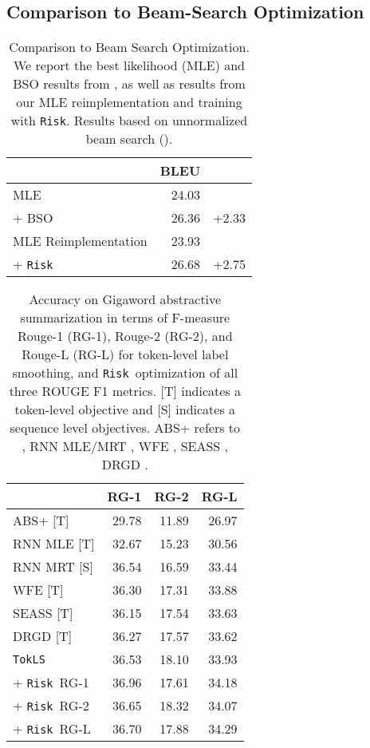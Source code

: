 \documentclass[11pt,a4paper]{article}
\newcommand{\TokLS}{\texttt{TokLS}}
\newcommand{\Risk}{\texttt{Risk}}
\begin{document}
\subsection{Comparison to Beam-Search Optimization}
\label{sec:bso}


\begin{table}[t]
\centering
\begin{tabular}{lrc}
\toprule
& \bf BLEU &  \\ \midrule
MLE & 24.03 & \\
+ BSO & 26.36 & +2.33 \\ 
\midrule
MLE Reimplementation & 23.93 & \\
+ \Risk & 26.68 & +2.75 \\
\bottomrule
\end{tabular}
\caption{Comparison to Beam Search Optimization. We report the best likelihood (MLE) and BSO results from \citet{wiseman2016acl}, as well as results from our MLE reimplementation and training with \Risk.
Results based on unnormalized beam search ().
}
\label{tab:bso}
\end{table}


\begin{table}[t]
\centering
\begin{tabular}{lrrr}
\toprule
& \bf RG-1 & \bf RG-2 & \bf RG-L \\ \midrule
ABS+  [T]           & 29.78 & 11.89 & 26.97 \\
RNN MLE [T]    & 32.67 & 15.23 & 30.56 \\
RNN MRT [S]    & 36.54 & 16.59 & 33.44 \\
WFE [T]      & 36.30 & 17.31 & 33.88 \\
SEASS  [T]       & 36.15 & 17.54 & 33.63 \\
DRGD [T]           & 36.27 & 17.57 & 33.62 \\
\midrule
\TokLS                               & 36.53 & 18.10 & 33.93 \\
+ \Risk~RG-1                         & 36.96 & 17.61 & 34.18 \\
+ \Risk~RG-2                         & 36.65 & 18.32 & 34.07 \\
+ \Risk~RG-L                         & 36.70 & 17.88 & 34.29 \\
\bottomrule
\end{tabular}
\caption{Accuracy on Gigaword abstractive summarization in terms of F-measure Rouge-1 (RG-1), Rouge-2 (RG-2), and Rouge-L (RG-L) for token-level label smoothing, and \Risk~optimization of all three ROUGE F1 metrics. [T] indicates a token-level objective and [S] indicates a sequence level objectives. 
ABS+ refers to \citet{rush2015abs}, RNN MLE/MRT \citep{ayana2016neural}, WFE \citep{suzuki2017cutting}, SEASS \citep{zhou2017seass}, DRGD \citep{li2017drgd}.
}
\label{tab:summary}
\end{table}
\end{document}
